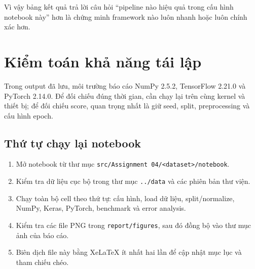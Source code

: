 \documentclass[12pt,a4paper]{report}
\newcommand{\modelpath}[1]{\texttt{#1}}
\begin{document}
Vì vậy bảng kết quả trả lời câu hỏi ``pipeline nào hiệu quả trong cấu hình notebook này'' hơn là chứng minh framework nào luôn nhanh hoặc luôn chính xác hơn.

\section{Kiểm toán khả năng tái lập}
\begin{table}[H]
\centering
\caption{Checklist tái lập Assignment 04}
\label{tab:reproducibility}
\end{table}

Trong output đã lưu, môi trường báo cáo NumPy 2.5.2, TensorFlow 2.21.0 và PyTorch 2.14.0.
Để đối chiếu đúng thời gian, cần chạy lại trên cùng kernel và thiết bị; để đối chiếu score, quan trọng nhất là giữ seed, split, preprocessing và cấu hình epoch.

\subsection{Thứ tự chạy lại notebook}
\begin{enumerate}
    \item Mở notebook từ thư mục \modelpath{src/Assignment 04/<dataset>/notebook}.
    \item Kiểm tra dữ liệu cục bộ trong thư mục \modelpath{../data} và các phiên bản thư viện.
    \item Chạy toàn bộ cell theo thứ tự: cấu hình, load dữ liệu, split/normalize, NumPy, Keras, PyTorch, benchmark và error analysis.
    \item Kiểm tra các file PNG trong \modelpath{report/figures}, sau đó đồng bộ vào thư mục ảnh của báo cáo.
    \item Biên dịch file này bằng XeLaTeX ít nhất hai lần để cập nhật mục lục và tham chiếu chéo.
\end{enumerate}
\end{document}
